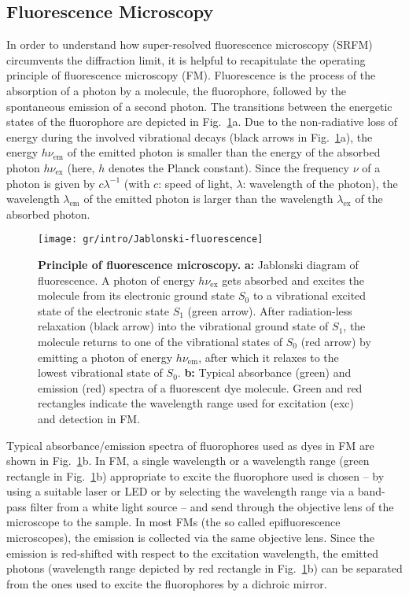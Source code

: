 
\subsection{Fluorescence Microscopy}
\label{sec:fm}
In order to understand how super-resolved fluorescence microscopy (SRFM)
circumvents the diffraction limit, it is helpful to recapitulate the operating
principle of fluorescence microscopy (FM). Fluorescence is the process of the
absorption of a photon by a molecule, the fluorophore, followed by the
spontaneous emission of a second photon. The transitions between the energetic
states of the fluorophore are depicted in
Fig.~\ref{fig:jablonski-fluorescence}a. Due to the non-radiative loss of
energy during the involved vibrational decays (black arrows in
Fig.~\ref{fig:jablonski-fluorescence}a), the energy $h\nu_\text{em}$ of the
emitted photon is smaller than the energy of the absorbed photon
$h\nu_\text{ex}$ (here, $h$ denotes the Planck constant). Since the frequency $\nu$
of a photon is given by $c\lambda^{-1}$ (with $c$: speed of light, $\lambda$:
wavelength of the photon), the wavelength $\lambda_\text{em}$ of the emitted
photon is larger than the wavelength $\lambda_\text{ex}$ of the absorbed
photon.      

\begin{figure}
  \centering
  \texttt{[image: gr/intro/Jablonski-fluorescence]}
  
  \caption{%
    \textbf{Principle of fluorescence microscopy.}  \textbf{a:} Jablonski
    diagram of fluorescence. A photon of energy $h\nu_\text{ex}$ gets absorbed
    and excites the molecule from its electronic ground state $S_0$ to a
    vibrational excited state of the electronic state $S_1$ (green
    arrow). After radiation-less relaxation (black arrow) into the vibrational
    ground state of $S_1$, the molecule returns to one of the vibrational
    states of $S_0$ (red arrow) by emitting a photon of energy
    $h\nu_\text{em}$, after which it relaxes to the lowest vibrational state
    of $S_0$.  \textbf{b:} Typical absorbance (green) and emission (red)
    spectra of a fluorescent dye molecule. Green and red rectangles indicate
    the wavelength range used for excitation (exc) and detection in FM.  }
  \label{fig:jablonski-fluorescence}
\end{figure}

Typical absorbance/emission spectra of fluorophores used as dyes in FM are
shown in Fig.~\ref{fig:jablonski-fluorescence}b. In FM, a single wavelength or
a wavelength range (green rectangle in Fig.~\ref{fig:jablonski-fluorescence}b) 
appropriate to excite the fluorophore used is chosen -- by using a suitable laser %
or LED or by selecting the wavelength range via a band-pass filter from a
white light source -- and send through the objective lens of the microscope to
the sample. In most FMs (the so called epifluorescence microscopes), the
emission is collected via the same objective lens. Since the emission is
red-shifted with respect to the excitation wavelength, the emitted photons
(wavelength range depicted by red rectangle in
Fig.~\ref{fig:jablonski-fluorescence}b) can be separated from the ones used to
excite the fluorophores by a dichroic mirror.

